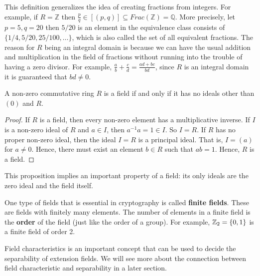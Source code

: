 \documentclass[../main.tex]{subfiles}
\begin{document}
This definition generalizes the idea of creating fractions from integers. For example, if $R=\mathbb{Z}$ then $\frac{p}{q} \in [(p,q)] \subseteq Frac(\mathbb{Z}) = \mathbb{Q}$. More precisely, let $p=5,q=20$ then $5/20$ is an element in the equivalence class consists of  $\{1/4,5/20,25/100,\dots\}$, which is also called the set of all equivalent fractions. The reason for $R$ being an integral domain is because we can have the usual addition and multiplication in the field of fractions without running into the trouble of having a zero divisor. For example, $\frac{a}{b}+\frac{c}{d} = \frac{ad+bc}{bd}$, since $R$ is an integral domain it is guaranteed that $bd \neq 0$.

\begin{proposition}
A non-zero commutative ring $R$ is a field if and only if it has no ideals other than $(0)$ and $R$.
\end{proposition}
\begin{proof}
If $R$ is a field, then every non-zero element has a multiplicative inverse. If $I$ is a non-zero ideal of $R$ and $a \in I$, then $a^{-1} a = 1 \in I$. So $I=R$. If $R$ has no proper non-zero ideal, then the ideal $I=R$ is a principal ideal. That is, $I=(a)$ for $a \neq 0$. Hence, there must exist an element $b \in R$ such that $ab=1$. Hence, $R$ is a field. 
\end{proof}

This proposition implies an important property of a field: its only ideals are the zero ideal and the field itself. 

One type of fields that is essential in cryptography is called \textbf{finite fields}.\reversemarginpar
{} These are fields with finitely many elements. The number of elements in a finite field is the \textbf{order} of the field (just like the order of a group). For example, $\mathbb{Z}_2 = \{0,1\}$ is a finite field of order 2. 


Field characteristics is an important concept that can be used to decide the separability of extension fields. We will see more about the connection between field characteristic and separability in a later section.  

\reversemarginpar
{}
\end{document}
